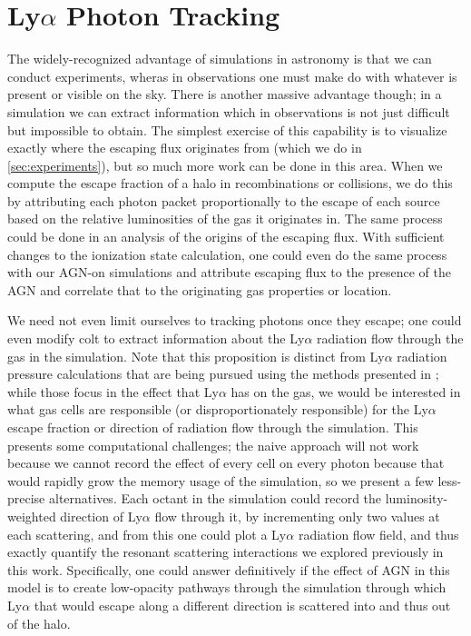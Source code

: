 \section{Ly\texorpdfstring{$\alpha$}{a} Photon Tracking}
The widely-recognized advantage of simulations in astronomy is that we can conduct experiments, wheras in observations one must make do with whatever is present or visible on the sky.
There is another massive advantage though; in a simulation we can extract information which in observations is not just difficult but impossible to obtain.
The simplest exercise of this capability is to visualize exactly where the escaping flux originates from (which we do in \ref{sec:experiments}), but so much more work can be done in this area.
When we compute the escape fraction of a halo in recombinations or collisions, we do this by attributing each photon packet proportionally to the escape of each source based on the relative luminosities of the gas it originates in.
The same process could be done in an analysis of the origins of the escaping flux.
With sufficient changes to the ionization state calculation, one could even do the same process with our AGN-on simulations and attribute escaping flux to the presence of the AGN and correlate that to the originating gas properties or location.

We need not even limit ourselves to tracking photons once they escape; one could even modify {\sc colt} to extract information about the Ly$\alpha$ radiation flow through the gas in the simulation.
Note that this proposition is distinct from Ly$\alpha$ radiation pressure calculations that are being pursued using the methods presented in \citet{Smith2018}; while those focus in the effect that Ly$\alpha$ has on the gas, we would be interested in what gas cells are responsible (or disproportionately responsible) for the Ly$\alpha$ escape fraction or direction of radiation flow through the simulation.
This presents some computational challenges; the naive approach will not work because we cannot record the effect of every cell on every photon because that would rapidly grow the memory usage of the simulation, so we present a few less-precise alternatives.
Each octant in the simulation could record the luminosity-weighted direction of Ly$\alpha$ flow through it, by incrementing only two values at each scattering, and from this one could plot a Ly$\alpha$ radiation flow field, and thus exactly quantify the resonant scattering interactions we explored previously in this work.
Specifically, one could answer definitively if the effect of AGN in this model is to create low-opacity pathways through the simulation through which Ly$\alpha$ that would escape along a different direction is scattered into and thus out of the halo.


